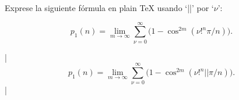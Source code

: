 

\bigskip

\enunciadoS Exprese la siguiente f\'ormula en plain {\TeX} usando
`|\nu|' por `$\nu$':

$$p_1(n) = \lim_{m \to \infty} \sum_{\nu=0}^{\infty}\bigl(1 - \cos^{2m}(\nu!^{n}\pi / n)\bigr) .$$

\respuestaS

\noindent|$$p_1(n) = \lim_{m \to \infty} \sum_{\nu=0}^{\infty}\bigl(1 - \cos^{2m}(\nu!^{n}|

|\pi / n)\bigr) .$$|

\bye

